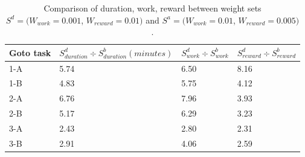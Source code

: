 \documentclass{tamuccthesis}
\begin{document}
\begin{table}[H]
    \centering
    \begin{tabular}{|l|l|l|l|}
        \hline
        Goto task & $S^d_{duration} \div S^b_{duration} (minutes)$ & $S^d_{work} \div S^b_{work}$ & $S^d_{reward} \div S^b_{reward}$ \\
        \hline
        1-A & 5.74 & 6.50 & 8.16 \\
        \hline
        1-B & 4.83 & 5.75 & 4.12 \\
        \hline
        2-A & 6.76 & 7.96 & 3.93 \\
        \hline
        2-B & 5.17 & 6.29 & 3.23 \\
        \hline
        3-A & 2.43 & 2.80 & 2.31 \\
        \hline
        3-B & 2.91 & 4.06 & 2.59 \\
        \hline
    \end{tabular}
    \caption[Varying optimization criteria weights, weight sets $S^d$ and $S^b$.]{Comparison of duration, work, reward between weight sets $S^d = (W_{work} = 0.001$, $W_{reward} = 0.01)$ and $S^a = (W_{work} = 0.01$, $W_{reward} = 0.005)$.}
    \label{tbl:weightDiff_d_b}
\end{table}
\end{document}
